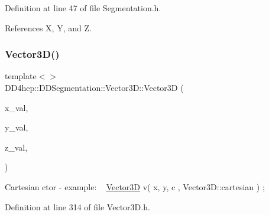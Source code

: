 Definition at line 47 of file Segmentation.\+h.



References X, Y, and Z.

\hypertarget{struct_d_d4hep_1_1_d_d_segmentation_1_1_vector3_d_af201d57d6352451f57d9cba70fda0dfd}{}\label{struct_d_d4hep_1_1_d_d_segmentation_1_1_vector3_d_af201d57d6352451f57d9cba70fda0dfd} 
\subsubsection{\texorpdfstring{Vector3\+D()}{Vector3D()}\hspace{0.1cm}{\footnotesize\ttfamily [3/5]}}
{\footnotesize\ttfamily template$<$$>$ \\
D\+D4hep\+::\+D\+D\+Segmentation\+::\+Vector3\+D\+::\+Vector3D (\begin{DoxyParamCaption}\item[{double}]{x\+\_\+val,  }\item[{double}]{y\+\_\+val,  }\item[{double}]{z\+\_\+val,  }\item[{\hyperlink{struct_d_d_surfaces_1_1_vector3_d_1_1_cartesian}{Vector3\+D\+::\+Cartesian}(\&)()}]{ }\end{DoxyParamCaption})\hspace{0.3cm}{\ttfamily [inline]}}

Cartesian c\textquotesingle{}tor -\/ example\+: ~\newline
 \hyperlink{struct_d_d4hep_1_1_d_d_segmentation_1_1_vector3_d}{Vector3D} v( x, y, c , Vector3\+D\+::cartesian ) ; 

Definition at line 314 of file Vector3\+D.\+h.

\hypertarget{struct_d_d4hep_1_1_d_d_segmentation_1_1_vector3_d_aa862100b1cfe813fd84a6b8fc0a8cf29}{}\label{struct_d_d4hep_1_1_d_d_segmentation_1_1_vector3_d_aa862100b1cfe813fd84a6b8fc0a8cf29} 
